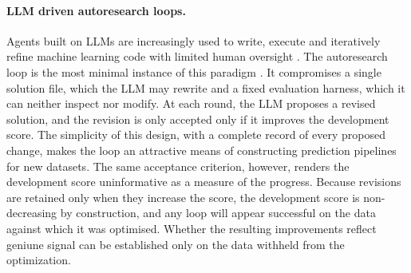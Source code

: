 \documentclass[11pt]{article}
\begin{document}
\paragraph{LLM driven autoresearch loops.}\label{sec:intro-loops} Agents built on LLMs are increasingly used to write, execute and iteratively refine machine learning code with limited human oversight \citep{huang2024mlagentbench,chan2024mlebench,jiang2025aide,lu2024aiscientist}. The autoresearch loop is the most minimal instance of this paradigm \citep{karpathy_autoresearch,autoepi}. 
It compromises a single solution file, which the LLM may rewrite and a fixed evaluation harness, which it can neither inspect nor modify. At each round, the LLM proposes a revised solution, and the revision is only accepted only if it improves the development score. The simplicity of this design, with a complete record of every proposed change, makes the loop an attractive means of constructing prediction pipelines for new datasets. 
The same acceptance criterion, however, renders the development score uninformative as a measure of the progress. Because revisions are retained only when they increase the score, the development score is non-decreasing by construction, and any loop will appear successful on the data against which 
it was optimised. Whether the resulting improvements reflect geniune signal can be established only on the data withheld from the optimization.  
\end{document}
